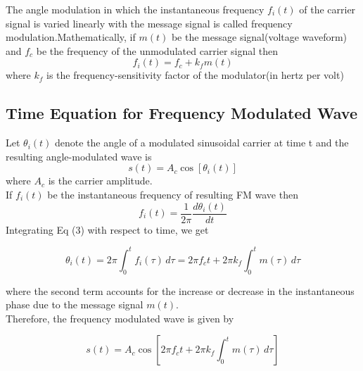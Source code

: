 \documentclass[12pt,a4paper]{article}%
\begin{document}
	\begin{flushleft}
	The angle modulation in which the instantaneous frequency $f_i(t)$ of the carrier signal is varied linearly with the message signal is called frequency modulation.Mathematically, if $m(t)$ be the message signal(voltage waveform) and $f_c$ be the frequency of the unmodulated carrier  signal then 
	\begin{equation} \label{eq:erl}
	f_i(t)=f_c+k_fm(t)
	\end{equation}
	where $k_f$ is the frequency-sensitivity factor of the modulator(in hertz per volt)
	\subsection{Time Equation for Frequency Modulated Wave}
	Let $\theta_i(t)$ denote the angle of a modulated sinusoidal carrier at time t and the resulting angle-modulated wave is 
	\begin{equation} \label{eq:erl}
	s(t)=A_c \cos{[\theta_i(t)]}
	\end{equation}
	where $A_c$ is the carrier amplitude.\\
	If $f_i(t)$ be the instantaneous frequency of resulting FM wave then 
	\begin{equation} \label{eq:erl}
	\displaystyle{f_i(t)= \frac{1}{2\pi}\frac{d\theta_i(t)}{dt}}
	\end{equation}
	Integrating Eq (3) with respect to time, we get
	
	
			$$\theta_i(t)= 2\pi \int_0^tf_i(\tau)\,d\tau=2\pi f_ct+2\pi k_f \int_0^tm(\tau)\,d\tau$$
			
	\begin{flushleft}
		where the second term accounts for the increase or decrease in the instantaneous phase due to the message signal $m(t)$.\\
		Therefore, the frequency modulated wave is given by
	\end{flushleft}
	$$s(t)=A_c \cos{[2\pi f_ct+2\pi k_f \int_0^tm(\tau)\,d\tau]}$$ 

\end{flushleft}
\end{document}
